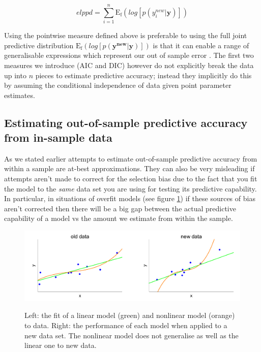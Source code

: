 \documentclass[11pt,fullpage]{book}
\begin{document}
\begin{equation}\label{eq:Evaluation_elppd}
elppd = \sum\limits_{i=1}^{n} \mathrm{E_f}\left(log\left[p(y^{new}_i|\boldsymbol{y})\right]\right)
\end{equation}

Using the pointwise measure defined above is preferable to using the full joint predictive distribution $\mathrm{E_f}\left(log\left[p(\boldsymbol{y^{new}}|\boldsymbol{y})\right]\right)$ is that it can enable a range of generalisable expressions which represent our out of sample error \cite{gelman2013bayesian}. The first two measures we introduce (AIC and DIC) however do not explicitly break the data up into $n$ pieces to estimate predictive accuracy; instead they implicitly do this by assuming the conditional independence of data given point parameter estimates.

\subsection{Estimating out-of-sample predictive accuracy from in-sample data}
As we stated earlier attempts to estimate out-of-sample predictive accuracy from within a sample are at-best approximations. They can also be very misleading if attempts aren't made to correct for the selection bias due to the fact that you fit the model to the \textit{same} data set you are using for testing its predictive capability. In particular, in situations of overfit models (see figure \ref{fig:Evaluation_overfit}) if these sources of bias aren't corrected then there will be a big gap between the actual predictive capability of a model vs the amount we estimate from within the sample.

\begin{figure}
\centering
\scalebox{0.5} 
{\includegraphics{Evaluation_overfit.pdf}}
\caption{Left: the fit of a linear model (green) and nonlinear model (orange) to data. Right: the performance of each model when applied to a new data set. The nonlinear model does not generalise as well as the linear one to new data.}\label{fig:Evaluation_overfit}
\end{figure}
\end{document}
